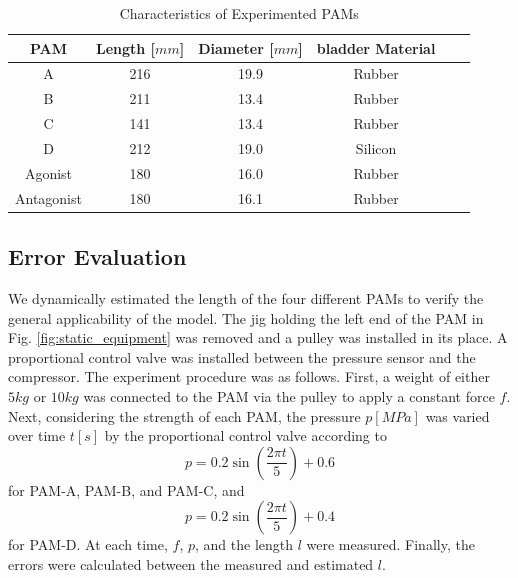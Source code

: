 \begin{table}[h]
    \centering
    \caption{Characteristics of Experimented PAMs}
    \begin{tabular}{c|ccccc}
        \hline
        PAM & Length [$\si{mm}$] & Diameter [$\si{mm}$] & bladder Material\\
        \hline \hline
        A & 216 & 19.9 &  Rubber \\
        B &211  & 13.4 &  Rubber \\
        C & 141 & 13.4 &  Rubber \\
        D & 212 & 19.0 & Silicon \\
        Agonist & 180 & 16.0 & Rubber \\
        Antagonist & 180 & 16.1 & Rubber \\
        \hline
    \end{tabular}
\label{tab:PAM}
\end{table}


\subsection{Error Evaluation}
We dynamically estimated the length of the four different PAMs to verify the general applicability of the model.
The jig holding the left end of the PAM in Fig. \ref{fig:static_equipment} was removed and a pulley was installed in its place. A proportional control valve was installed between the pressure sensor and the compressor.
The experiment procedure was as follows. First, a weight of either $5\si{kg}$ or $10\si{kg}$ was connected to the PAM via the pulley to apply a constant force $f$. Next, considering the strength of each PAM, the pressure $p [\si{MPa}]$ was varied over time $t [\si{s}]$ by the proportional control valve according to 
\begin{equation}
p = 0.2 \sin\left(\frac{2 \pi t}{5}\right) + 0.6
\label{eq:Pref}
\end{equation}
for PAM-A, PAM-B, and PAM-C, and
\begin{equation}
p = 0.2 \sin\left(\frac{2 \pi t}{5}\right) + 0.4
\label{eq:Prefd}
\end{equation}
for PAM-D. At each time, $f$, $p$, and the length $l$ were measured. 
Finally, the errors were calculated between the measured and estimated $l$.

